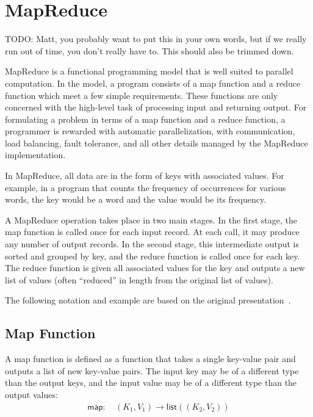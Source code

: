 \documentclass[letterpaper]{sig-alternate}
\providecommand{\List}[1]{\ensuremath{\mathsf{list}(#1)}}
\providecommand{\InputKeySet}{\ensuremath{K_1}}
\providecommand{\OutputKeySet}{\ensuremath{K_2}}
\providecommand{\InputValSet}{\ensuremath{V_1}}
\providecommand{\OutputValSet}{\ensuremath{V_2}}
\begin{document}


\section{MapReduce}
\label{sec:mapreduce}

TODO: Matt, you probably want to put this in your own words, but if we
really run out of time, you don't really have to.  This should also be trimmed
down.

MapReduce is a functional programming model that is well suited to parallel
computation.  In the model, a program consists of a map function and a reduce
function which meet a few simple requirements.  These functions are only
concerned with the high-level task of processing input and returning output.
For formulating a problem in terms of a map function and a reduce function, a
programmer is rewarded with automatic parallelization, with communication,
load balancing, fault tolerance, and all other details managed by the
MapReduce implementation.

In MapReduce, all data are in the form of keys with associated values.  For
example, in a program that counts the frequency of occurrences for various
words, the key would be a word and the value would be its frequency.

A MapReduce operation takes place in two main stages.  In the first stage, the
map function is called once for each input record.  At each call, it may
produce any number of output records.  In the second stage, this intermediate
output is sorted and grouped by key, and the reduce function is called once
for each key.  The reduce function is given all associated values for the
key and outputs a new list of values (often ``reduced'' in length from the
original list of values).

The following notation and example are based on the original
presentation~\cite{dean-osdi04}.

\subsection{Map Function}

A map function is defined as a function that takes a single key-value pair and
outputs a list of new key-value pairs.  The input key may be of a different
type than the output keys, and the input value may be of a different type than
the output values:
\begin{align}
\mathsf{map}:\:&(\InputKeySet, \InputValSet) \rightarrow
    \List{(\OutputKeySet, \OutputValSet)}
\end{align}
\end{document}
